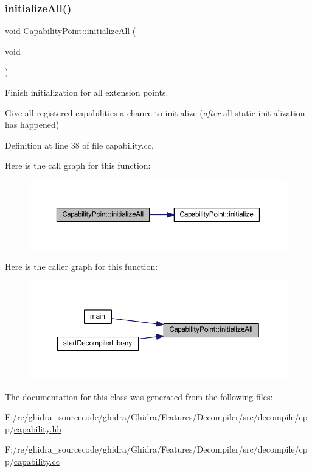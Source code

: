 \subsubsection{\texorpdfstring{initializeAll()}{initializeAll()}}
{\footnotesize\ttfamily void Capability\+Point\+::initialize\+All (\begin{DoxyParamCaption}\item[{void}]{ }\end{DoxyParamCaption})\hspace{0.3cm}{\ttfamily [static]}}



Finish initialization for all extension points. 

Give all registered capabilities a chance to initialize ({\itshape after} all static initialization has happened) 

Definition at line 38 of file capability.\+cc.

Here is the call graph for this function\+:
\nopagebreak
\begin{figure}[H]
\begin{center}
\leavevmode
\includegraphics[width=350pt]{class_capability_point_a4ea216194d3e4cb1f0994dfcbd653a45_cgraph}
\end{center}
\end{figure}
Here is the caller graph for this function\+:
\nopagebreak
\begin{figure}[H]
\begin{center}
\leavevmode
\includegraphics[width=350pt]{class_capability_point_a4ea216194d3e4cb1f0994dfcbd653a45_icgraph}
\end{center}
\end{figure}


The documentation for this class was generated from the following files\+:\begin{DoxyCompactItemize}
\item 
F\+:/re/ghidra\+\_\+sourcecode/ghidra/\+Ghidra/\+Features/\+Decompiler/src/decompile/cpp/\mbox{\hyperlink{capability_8hh}{capability.\+hh}}\item 
F\+:/re/ghidra\+\_\+sourcecode/ghidra/\+Ghidra/\+Features/\+Decompiler/src/decompile/cpp/\mbox{\hyperlink{capability_8cc}{capability.\+cc}}\end{DoxyCompactItemize}
